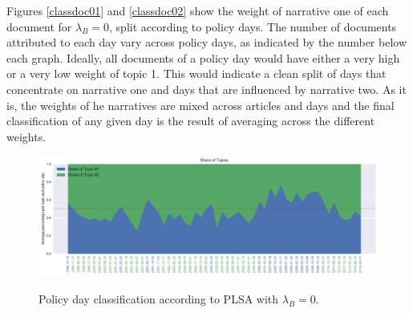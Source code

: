 \documentclass[11pt,a4paper,english,oneside]{book}
\numberwithin{equation}{chapter}
\begin{document}
Figures \ref{classdoc01} and \ref{classdoc02} show the weight of narrative one of each document for $\lambda_B = 0$, split according to policy days. The number of documents attributed to each day vary across policy days, as indicated by the number below each graph. Ideally, all documents of a policy day would have either a very high or a very low weight of topic 1. This would indicate a clean split of days that concentrate on narrative one and days that are influenced by narrative two. As it is, the weights of he narratives are mixed across articles and days and the final classification of any given day is the result of averaging across the different weights.   

\begin{figure}
	\caption{Policy day classification according to PLSA with $\lambda_B = 0$.}
	\centering
	\includegraphics[scale=0.8]{Images/plsamodelling_bgLamb_0_0}
	\label{classPLSA}
\end{figure}
\end{document}
